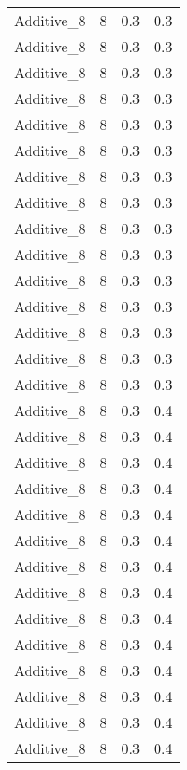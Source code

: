 \documentclass{article}
\begin{document}
\begin{longtable}[H]{lrrr}
 Additive\_8 &       8 &   0.3 &            0.3 \\
 Additive\_8 &       8 &   0.3 &            0.3 \\
 Additive\_8 &       8 &   0.3 &            0.3 \\
 Additive\_8 &       8 &   0.3 &            0.3 \\
 Additive\_8 &       8 &   0.3 &            0.3 \\
 Additive\_8 &       8 &   0.3 &            0.3 \\
 Additive\_8 &       8 &   0.3 &            0.3 \\
 Additive\_8 &       8 &   0.3 &            0.3 \\
 Additive\_8 &       8 &   0.3 &            0.3 \\
 Additive\_8 &       8 &   0.3 &            0.3 \\
 Additive\_8 &       8 &   0.3 &            0.3 \\
 Additive\_8 &       8 &   0.3 &            0.3 \\
 Additive\_8 &       8 &   0.3 &            0.3 \\
 Additive\_8 &       8 &   0.3 &            0.3 \\
 Additive\_8 &       8 &   0.3 &            0.3 \\
 Additive\_8 &       8 &   0.3 &            0.4 \\
 Additive\_8 &       8 &   0.3 &            0.4 \\
 Additive\_8 &       8 &   0.3 &            0.4 \\
 Additive\_8 &       8 &   0.3 &            0.4 \\
 Additive\_8 &       8 &   0.3 &            0.4 \\
 Additive\_8 &       8 &   0.3 &            0.4 \\
 Additive\_8 &       8 &   0.3 &            0.4 \\
 Additive\_8 &       8 &   0.3 &            0.4 \\
 Additive\_8 &       8 &   0.3 &            0.4 \\
 Additive\_8 &       8 &   0.3 &            0.4 \\
 Additive\_8 &       8 &   0.3 &            0.4 \\
 Additive\_8 &       8 &   0.3 &            0.4 \\
 Additive\_8 &       8 &   0.3 &            0.4 \\
 Additive\_8 &       8 &   0.3 &            0.4 \\

\end{longtable}
\end{document}
